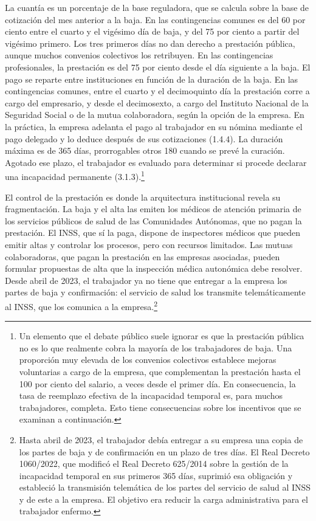 \documentclass[10pt,a4paper]{article}
\begin{document}
La cuantía es un porcentaje de la base reguladora, que se calcula sobre la base de cotización del mes anterior a la baja. En las contingencias comunes es del 60 por ciento entre el cuarto y el vigésimo día de baja, y del 75 por ciento a partir del vigésimo primero. Los tres primeros días no dan derecho a prestación pública, aunque muchos convenios colectivos los retribuyen. En las contingencias profesionales, la prestación es del 75 por ciento desde el día siguiente a la baja. El pago se reparte entre instituciones en función de la duración de la baja. En las contingencias comunes, entre el cuarto y el decimoquinto día la prestación corre a cargo del empresario, y desde el decimosexto, a cargo del Instituto Nacional de la Seguridad Social o de la mutua colaboradora, según la opción de la empresa. En la práctica, la empresa adelanta el pago al trabajador en su nómina mediante el pago delegado y lo deduce después de sus cotizaciones (1.4.4). La duración máxima es de 365 días, prorrogables otros 180 cuando se prevé la curación. Agotado ese plazo, el trabajador es evaluado para determinar si procede declarar una incapacidad permanente (3.1.3).\footnote{%
    Un elemento que el debate público suele ignorar es que la prestación pública no es lo que realmente cobra la mayoría de los trabajadores de baja. Una proporción muy elevada de los convenios colectivos establece mejoras voluntarias a cargo de la empresa, que complementan la prestación hasta el 100 por ciento del salario, a veces desde el primer día. En consecuencia, la tasa de reemplazo efectiva de la incapacidad temporal es, para muchos trabajadores, completa. Esto tiene consecuencias sobre los incentivos que se examinan a continuación.
}

El control de la prestación es donde la arquitectura institucional revela su fragmentación. La baja y el alta las emiten los médicos de atención primaria de los servicios públicos de salud de las Comunidades Autónomas, que no pagan la prestación. El INSS, que sí la paga, dispone de inspectores médicos que pueden emitir altas y controlar los procesos, pero con recursos limitados. Las mutuas colaboradoras, que pagan la prestación en las empresas asociadas, pueden formular propuestas de alta que la inspección médica autonómica debe resolver. Desde abril de 2023, el trabajador ya no tiene que entregar a la empresa los partes de baja y confirmación: el servicio de salud los transmite telemáticamente al INSS, que los comunica a la empresa.\footnote{%
    Hasta abril de 2023, el trabajador debía entregar a su empresa una copia de los partes de baja y de confirmación en un plazo de tres días. El Real Decreto 1060/2022, que modificó el Real Decreto 625/2014 sobre la gestión de la incapacidad temporal en sus primeros 365 días, suprimió esa obligación y estableció la transmisión telemática de los partes del servicio de salud al INSS y de este a la empresa. El objetivo era reducir la carga administrativa para el trabajador enfermo.
}
\end{document}
